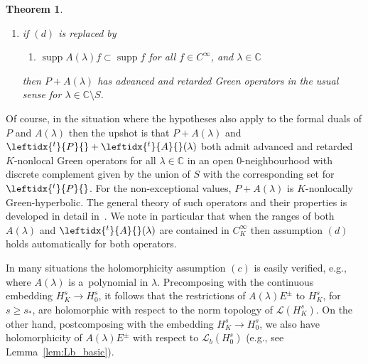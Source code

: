 \documentclass[pdftex]{sigma}
\numberwithin{equation}{section}
\newtheorem{Theorem}{Theorem}[section]
\newcommand{\CC}{{\mathbb C}}
\newcommand{\LL}{{\mathcal L}}
\DeclareMathOperator{\supp}{supp}
\newcommand{\adj}[1]{\leftidx{^{t}}{#1}{}}
\begin{document}
\begin{Theorem}
\begin{enumerate}
 		\item[$(E)$]%
 if $(d)$ is replaced by
 		\begin{enumerate}
 			\item[$(d')$] $\supp A(\lambda)f\subset \supp f$ for all $f\in C^\infty$, and $\lambda\in\CC$
 		\end{enumerate}
 		then $P+ A(\lambda)$ has advanced and retarded Green operators in the usual sense
 		for $\lambda\in\CC\setminus S$.
 	\end{enumerate}
 \end{Theorem}
 Of course, in the situation where the hypotheses also apply to the formal duals of $P$ and $A(\lambda)$ then the upshot is that $P+ A(\lambda)$ and $\adj{P}+\adj{A}(\lambda)$
 both admit advanced and retarded $K$-nonlocal Green operators for all
 $\lambda\in\CC$ in an open $0$-neighbourhood with discrete complement given by the union of $S$ with the corresponding set for $\adj{P}$. For the non-exceptional values, $P+A(\lambda)$ is $K$-nonlocally Green-hyperbolic. The general theory of such operators and their properties is developed in detail in~\cite{FewVer:20xx}. We note in particular that when
 the ranges of both $A(\lambda)$ and $\adj{A}(\lambda)$ are contained in $C^\infty_K$ then assumption $(d)$ holds automatically for both operators.

 In many situations the holomorphicity assumption $(c)$ is easily verified, e.g., where $A(\lambda)$ is a~polynomial in $\lambda$. Precomposing with the continuous embedding $H^s_K\to H^s_0$, it follows that the restrictions of $A(\lambda)E^\pm$ to $H^s_K$, for $s\ge s_*$, are holomorphic with respect to the norm topology
 of $\LL(H^s_K)$. On the other hand, postcomposing with the embedding $H^s_K\to H^s_0$, we also have holomorphicity of $A(\lambda)E^\pm$ with respect to
 $\LL_b(H^s_0)$ (e.g., see Lemma~\ref{lem:Lb_basic}).
\end{document}
